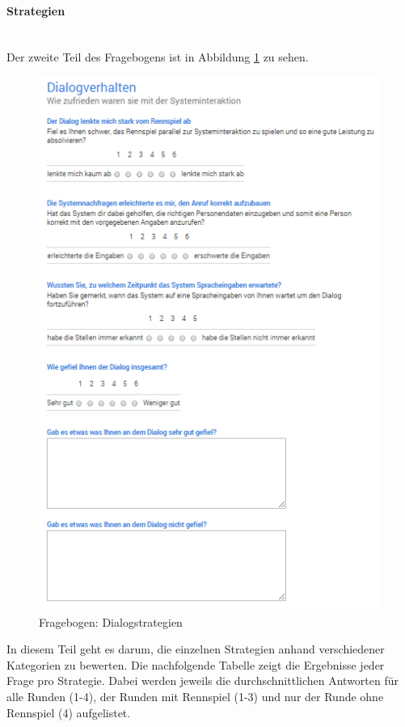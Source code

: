 \documentclass[12pt,a4paper]{scrartcl}
\begin{document}
\paragraph{Strategien}
~\\
Der zweite Teil des Fragebogens ist in Abbildung \ref{fbstrategien1} zu sehen. 
\newline
\begin{figure}[htbp]
\begin{center}
\includegraphics[width=12cm]{fbdialog.png}
\caption{Fragebogen: Dialogstrategien}
\label{fbstrategien1}
\end{center}
\end{figure}

In diesem Teil geht es darum, die einzelnen Strategien anhand verschiedener Kategorien zu bewerten.
Die nachfolgende Tabelle zeigt die Ergebnisse jeder Frage pro Strategie. Dabei werden jeweils die durchschnittlichen Antworten für alle Runden (1-4), der Runden mit Rennspiel (1-3) und nur der Runde ohne Rennspiel (4) aufgelistet. 
\newline
\end{document}
